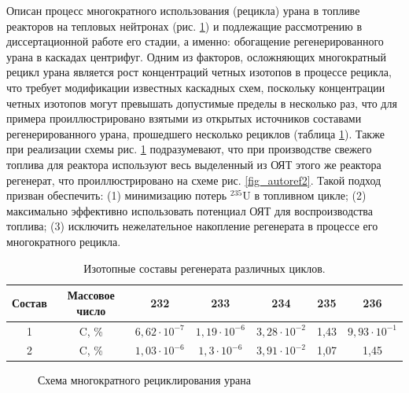 Описан процесс многократного использования (рецикла) урана в топливе реакторов на тепловых нейтронах (рис. \ref{fig_autoref1}) и подлежащие рассмотрению в диссертационной работе его стадии, а именно: обогащение регенерированного урана в каскадах центрифуг. Одним из факторов, осложняющих многократный рецикл урана является рост концентраций четных изотопов в процессе рецикла, что требует модификации известных каскадных схем, поскольку концентрации четных изотопов могут превышать допустимые пределы в несколько раз, что для примера проиллюстрировано взятыми из открытых источников составами регенерированного урана, прошедшего несколько рециклов (таблица \ref{is_compositions_2_5autoref}). Также при реализации схемы рис. \ref{fig_autoref1} подразумевают, что при производстве свежего топлива для реактора используют весь выделенный из ОЯТ этого же реактора регенерат, что проиллюстрировано на схеме рис. \ref{fig_autoref2}.  Такой подход призван обеспечить: (1) минимизацию потерь  $^{235}$U в топливном цикле; (2) максимально эффективно использовать потенциал ОЯТ для воспроизводства топлива; (3) исключить нежелательное накопление регенерата в процессе его многократного рецикла.
\begin{table}[h]
  \centering
  \caption{{Изотопные составы регенерата различных циклов.{\label{is_compositions_2_5autoref}}}}
  \begin{tabular}{|c||c|c|c|c|c|c|}
  \hline {\tiny Состав} & {\tiny Массовое число} & 232 & 233 & 234 & 235 & 236 \\
  \hline 1 & C, \% & $6,62\cdot10^{-7}$ & $1,19\cdot10^{-6}$ & $3,28\cdot10^{-2}$ & 1,43 & $9,93\cdot10^{-1}$ \\
  2 & C, \% &  $1,03\cdot10^{-6}$ & $1,3\cdot10^{-6}$ & $3,91\cdot10^{-2}$ & 1,07 & 1,45 \\\hline
  \end{tabular}
\end{table}

\begin{figure}[ht]
  \caption{Схема многократного рециклирования урана}\label{fig_autoref1}
\end{figure}

